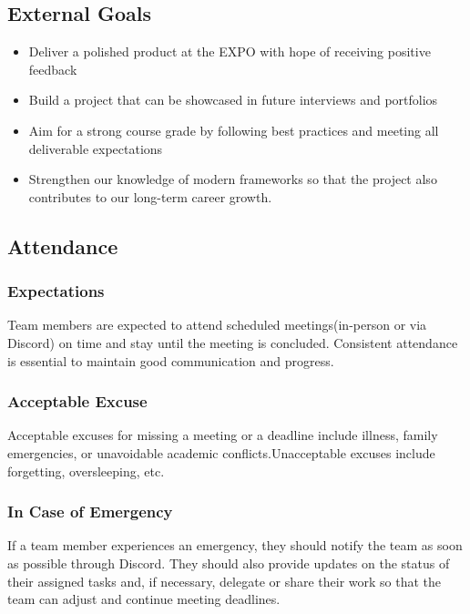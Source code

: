 \documentclass{article}
\begin{document}
\subsection*{External Goals}

\begin{itemize}
	\item Deliver a polished product at the EXPO with hope of receiving positive feedback
	\item Build a project that can be showcased in future interviews and portfolios
	\item Aim for a strong course grade by following best practices and meeting all deliverable expectations
	\item Strengthen our knowledge of modern frameworks so that the project also contributes to our long-term career growth.
\end{itemize}

\subsection*{Attendance}

\subsubsection*{Expectations}

Team members are expected to attend scheduled meetings(in-person or via Discord) on time and stay until the meeting is concluded.  Consistent attendance is essential to maintain good communication and progress.

\subsubsection*{Acceptable Excuse}

Acceptable excuses for missing a meeting or a deadline include illness, family emergencies, or unavoidable academic conflicts.Unacceptable excuses include forgetting, oversleeping, etc.

\subsubsection*{In Case of Emergency}

If a team member experiences an emergency, they should notify the team as soon as possible through Discord. They should also provide updates on the status of their assigned tasks and, if necessary, delegate or share their work so that the team can adjust and continue meeting deadlines.
\end{document}
